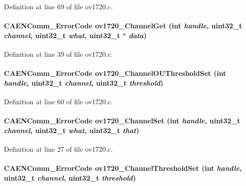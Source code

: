 Definition at line 69 of file ov1720.c.
\paragraph[{ov1720\_\-ChannelGet}]{\setlength{\rightskip}{0pt plus 5cm}CAENComm\_\-ErrorCode ov1720\_\-ChannelGet (int {\em handle}, \/  uint32\_\-t {\em channel}, \/  uint32\_\-t {\em what}, \/  uint32\_\-t $\ast$ {\em data})}\hfill\label{ov1720_8c_a994ae975810199e601a80259fd19a53c}


Definition at line 39 of file ov1720.c.
\paragraph[{ov1720\_\-ChannelOUThresholdSet}]{\setlength{\rightskip}{0pt plus 5cm}CAENComm\_\-ErrorCode ov1720\_\-ChannelOUThresholdSet (int {\em handle}, \/  uint32\_\-t {\em channel}, \/  uint32\_\-t {\em threshold})}\hfill\label{ov1720_8c_a4c37b778f092b4c80a33969818329408}


Definition at line 60 of file ov1720.c.
\paragraph[{ov1720\_\-ChannelSet}]{\setlength{\rightskip}{0pt plus 5cm}CAENComm\_\-ErrorCode ov1720\_\-ChannelSet (int {\em handle}, \/  uint32\_\-t {\em channel}, \/  uint32\_\-t {\em what}, \/  uint32\_\-t {\em that})}\hfill\label{ov1720_8c_ad0814d67c07ad3d78d21497f9dc3e2e3}


Definition at line 27 of file ov1720.c.
\paragraph[{ov1720\_\-ChannelThresholdSet}]{\setlength{\rightskip}{0pt plus 5cm}CAENComm\_\-ErrorCode ov1720\_\-ChannelThresholdSet (int {\em handle}, \/  uint32\_\-t {\em channel}, \/  uint32\_\-t {\em threshold})}\hfill\label{ov1720_8c_ab3f695987151872ff15f4cfb06e048b5}


